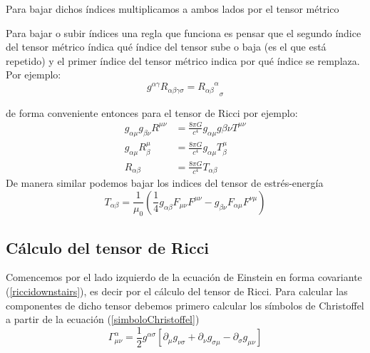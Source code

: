 Para bajar dichos índices multiplicamos a ambos lados por el tensor métrico\begin{marginfigure}
\begin{extrabox}{}
Para bajar o subir índices una regla que funciona es pensar que el segundo índice del tensor métrico índica qué índice del tensor sube o baja (es el que está repetido) y el primer índice del tensor métrico indica por qué índice se remplaza. Por ejemplo:
\begin{equation}
    g^{\alpha\gamma} R_{\alpha\beta\gamma\sigma} = {{R_{\alpha\beta}}^\alpha}_\sigma
\end{equation}
\end{extrabox}
\end{marginfigure} de forma conveniente entonces para el tensor de Ricci por ejemplo:
\begin{equation}
\begin{split}
g_{\alpha\mu}g_{\beta\nu}R^{\mu\nu} &= \frac{8 \pi G}{c^4}g_{\alpha\mu}g{\beta\nu}T^{\mu\nu} \\    
g_{\alpha\mu}R^{\mu}_\beta &= \frac{8 \pi G}{c^4}g_{\alpha\mu}T^{\mu}_\beta \\    
R_{\alpha\beta} &= \frac{8 \pi G}{c^4}T_{\alpha\beta}   
\end{split}
\label{riccidownstairs}
\end{equation}
De manera similar podemos bajar los indices del tensor de estrés-energía
\begin{equation}
T_{\alpha\beta}=\frac{1}{\mu_0}\left(\frac{1}{4}g_{\alpha\beta}F_{\mu\nu}F^{\mu\nu}-g_{\beta\nu}F_{\alpha\mu}F^{\nu\mu}\right)
\label{tensorestresdownstairs}
\end{equation}

\subsection*{\textbf{Cálculo del tensor de Ricci}}

Comencemos por el lado izquierdo de la ecuación de Einstein en forma covariante (\ref{riccidownstairs}), es decir por el cálculo del tensor de Ricci. Para calcular las componentes de dicho tensor debemos primero calcular los símbolos de Christoffel a partir de la ecuación (\ref{simboloChristoffel}) 
\begin{equation*}
\Gamma^{\alpha}_{\mu \nu}=\frac{1}{2}g^{\alpha\sigma}\left[\partial_{\mu}g_{\nu\sigma}+\partial_{\nu}g_{\sigma \mu}-\partial_{\sigma}g_{\mu\nu}\right]
\end{equation*}

